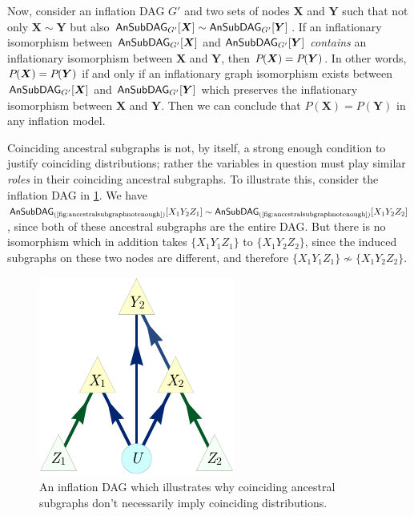 Now, consider an inflation DAG $G'$ and two sets of nodes $\bm{X}$ and $\bm{Y}$ such that not only $\bm{X}\sim\bm{Y}$ but also $\ansubgraph[G']{\bm{X}}\sim\ansubgraph[G']{\bm{Y}}$. If an inflationary isomorphism between $\ansubgraph[G']{\bm{X}}$ and $\ansubgraph[G']{\bm{Y}}$ \emph{contains} an inflationary isomorphism between $\bm{X}$ and $\bm{Y}$, then $\pdf{\bm{X}}=\pdf{\bm{Y}}$. In other words, $\pdf{\bm{X}}=\pdf{\bm{Y}}$ if and only if an inflationary graph isomorphism exists between $\ansubgraph[G']{\bm{X}}$ and $\ansubgraph[G']{\bm{Y}}$ which preserves the inflationary isomorphism between $\bm{X}$ and $\bm{Y}$. Then we can conclude that $P(\bm{X}) = P(\bm{Y})$ in any inflation model.

Coinciding ancestral subgraphs is not, by itself, a strong enough condition to justify coinciding distributions; rather the variables in question must play similar \emph{roles} in their coinciding ancestral subgraphs. To illustrate this, consider the inflation DAG in \cref{fig:ancestralsubgraphnotenough}. We have $\ansubgraph[(\textrm{\cref{fig:ancestralsubgraphnotenough}})]{X_1 Y_2 Z_1}\sim\ansubgraph[(\textrm{\cref{fig:ancestralsubgraphnotenough}})]{X_1 Y_2 Z_2}$, since both of these ancestral subgraphs are the entire DAG. But there is no isomorphism which in addition takes $\{X_1 Y_1 Z_1\}$ to $\{X_1 Y_2 Z_2\}$, since the induced subgraphs on these two nodes are different, and therefore $\{X_1 Y_1 Z_1\}\not\sim\{X_1 Y_2 Z_2\}$.

\begin{figure}[H]
    \centering
    \begin{minipage}[t]{0.6\linewidth}      \centering
    \includegraphics[scale=1]{instrumentalvariant.pdf}
    \caption{An inflation DAG which illustrates why coinciding ancestral subgraphs don't necessarily imply coinciding distributions.}
    \label{fig:ancestralsubgraphnotenough}
    \end{minipage}
\end{figure}

